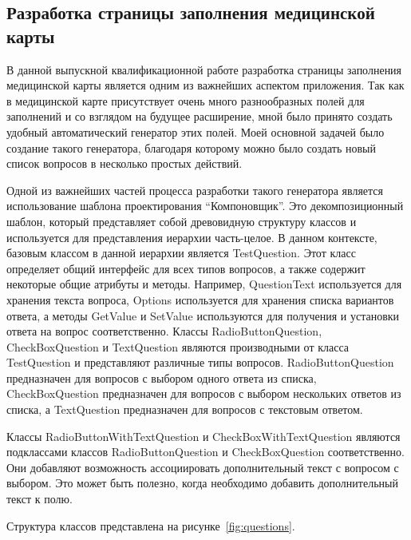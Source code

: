 \subsection{Разработка страницы заполнения медицинской карты}
В данной выпускной квалификационной работе разработка страницы заполнения медицинской карты является одним из важнейших аспектом приложения. Так как в медицинской карте присутствует очень много разнообразных полей для заполнений и со взглядом на будущее расширение, мной было принято создать удобный автоматический генератор этих полей. Моей основной задачей было создание такого генератора, благодаря которому можно было создать новый список вопросов в несколько простых действий.

Одной из важнейших частей процесса разработки такого генератора является использование шаблона проектирования \enquote{Компоновщик}. Это декомпозиционный шаблон, который представляет собой древовидную структуру классов и используется для представления иерархии часть-целое. В данном контексте, базовым классом в данной иерархии является TestQuestion. Этот класс определяет общий интерфейс для всех типов вопросов, а также содержит некоторые общие атрибуты и методы. Например, QuestionText используется для хранения текста вопроса, Options используется для хранения списка вариантов ответа, а методы GetValue и SetValue используются для получения и установки ответа на вопрос соответственно. Классы RadioButtonQuestion, CheckBoxQuestion и TextQuestion являются производными от класса TestQuestion и представляют различные типы вопросов. RadioButtonQuestion предназначен для вопросов с выбором одного ответа из списка, CheckBoxQuestion предназначен для вопросов с выбором нескольких ответов из списка, а TextQuestion предназначен для вопросов с текстовым ответом.

Классы RadioButtonWithTextQuestion и CheckBoxWithTextQuestion являются подклассами классов RadioButtonQuestion и CheckBoxQuestion соответственно. Они добавляют возможность ассоциировать дополнительный текст с вопросом с выбором. Это может быть полезно, когда необходимо добавить дополнительный текст к полю.

Структура классов представлена на рисунке~\ref{fig:questions}.

